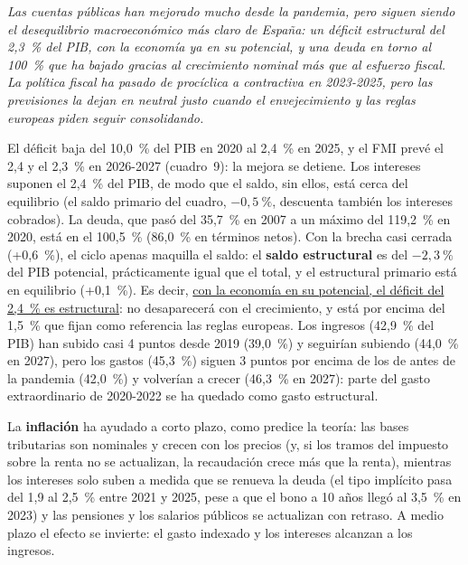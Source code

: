 \begin{examen}
\textit{Las cuentas públicas han mejorado mucho desde la pandemia, pero siguen siendo el desequilibrio macroeconómico más claro de España: un déficit estructural del 2,3~\% del PIB, con la economía ya en su potencial, y una deuda en torno al 100~\% que ha bajado gracias al crecimiento nominal más que al esfuerzo fiscal. La política fiscal ha pasado de procíclica a contractiva en 2023-2025, pero las previsiones la dejan en neutral justo cuando el envejecimiento y las reglas europeas piden seguir consolidando.}

El déficit baja del 10,0~\% del PIB en 2020 al 2,4~\% en 2025, y el FMI prevé el 2,4 y el 2,3~\% en 2026-2027 (cuadro~9): la mejora se detiene. Los intereses suponen el 2,4~\% del PIB, de modo que el saldo, sin ellos, está cerca del equilibrio (el saldo primario del cuadro, $-0{,}5~\%$, descuenta también los intereses cobrados). La deuda, que pasó del 35,7~\% en 2007 a un máximo del 119,2~\% en 2020, está en el 100,5~\% (86,0~\% en términos netos). Con la brecha casi cerrada (+0,6~\%), el ciclo apenas maquilla el saldo: el \textbf{saldo estructural} es del $-2{,}3~\%$ del PIB potencial, prácticamente igual que el total, y el estructural primario está en equilibrio (+0,1~\%). Es decir, \uline{con la economía en su potencial, el déficit del 2,4~\% es estructural}: no desaparecerá con el crecimiento, y está por encima del 1,5~\% que fijan como referencia las reglas europeas. Los ingresos (42,9~\% del PIB) han subido casi 4 puntos desde 2019 (39,0~\%) y seguirían subiendo (44,0~\% en 2027), pero los gastos (45,3~\%) siguen 3 puntos por encima de los de antes de la pandemia (42,0~\%) y volverían a crecer (46,3~\% en 2027): parte del gasto extraordinario de 2020-2022 se ha quedado como gasto estructural.

La \textbf{inflación} ha ayudado a corto plazo, como predice la teoría: las bases tributarias son nominales y crecen con los precios (y, si los tramos del impuesto sobre la renta no se actualizan, la recaudación crece más que la renta), mientras los intereses solo suben a medida que se renueva la deuda (el tipo implícito pasa del 1,9 al 2,5~\% entre 2021 y 2025, pese a que el bono a 10 años llegó al 3,5~\% en 2023) y las pensiones y los salarios públicos se actualizan con retraso. A medio plazo el efecto se invierte: el gasto indexado y los intereses alcanzan a los ingresos.


\end{examen}
